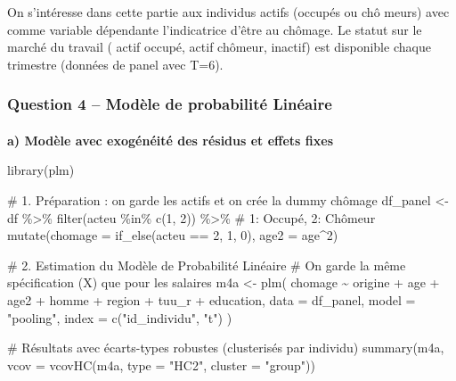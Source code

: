 \documentclass[
  letterpaper,
  DIV=11,
  numbers=noendperiod]{scrartcl}
\makeatletter
\let\oldparagraph\paragraph
\renewcommand{\paragraph}{
    \@ifstar
      \xxxParagraphStar
      \xxxParagraphNoStar
  }
\newcommand{\xxxParagraphStar}[1]{\oldparagraph*{#1}\mbox{}}
\newcommand{\xxxParagraphNoStar}[1]{\oldparagraph{#1}\mbox{}}
\newenvironment{Shaded}{\begin{snugshade}}{\end{snugshade}}
\newcommand{\AttributeTok}[1]{\textcolor[rgb]{0.40,0.45,0.13}{#1}}
\newcommand{\CommentTok}[1]{\textcolor[rgb]{0.37,0.37,0.37}{#1}}
\newcommand{\DecValTok}[1]{\textcolor[rgb]{0.68,0.00,0.00}{#1}}
\newcommand{\FunctionTok}[1]{\textcolor[rgb]{0.28,0.35,0.67}{#1}}
\newcommand{\NormalTok}[1]{\textcolor[rgb]{0.00,0.23,0.31}{#1}}
\newcommand{\OtherTok}[1]{\textcolor[rgb]{0.00,0.23,0.31}{#1}}
\newcommand{\SpecialCharTok}[1]{\textcolor[rgb]{0.37,0.37,0.37}{#1}}
\newcommand{\StringTok}[1]{\textcolor[rgb]{0.13,0.47,0.30}{#1}}
\makeatother
\begin{document}
On s'intéresse dans cette partie aux individus actifs (occupés ou chô
meurs) avec comme variable dépendante l'indicatrice d'être au chômage.
Le statut sur le marché du travail ( actif occupé, actif chômeur,
inactif) est disponible chaque trimestre (données de panel avec T=6).

\subsubsection{Question 4 -- Modèle de probabilité
Linéaire}\label{question-4-moduxe8le-de-probabilituxe9-linuxe9aire}

\paragraph{\texorpdfstring{\textbf{a) Modèle avec exogénéité des résidus
et effets
fixes}}{a) Modèle avec exogénéité des résidus et effets fixes}}\label{a-moduxe8le-avec-exoguxe9nuxe9ituxe9-des-ruxe9sidus-et-effets-fixes}

\begin{Shaded}
\begin{Highlighting}[]
\FunctionTok{library}\NormalTok{(plm)}

\CommentTok{\# 1. Préparation : on garde les actifs et on crée la dummy chômage}
\NormalTok{df\_panel }\OtherTok{\textless{}{-}}\NormalTok{ df }\SpecialCharTok{\%\textgreater{}\%}
  \FunctionTok{filter}\NormalTok{(acteu }\SpecialCharTok{\%in\%} \FunctionTok{c}\NormalTok{(}\DecValTok{1}\NormalTok{, }\DecValTok{2}\NormalTok{)) }\SpecialCharTok{\%\textgreater{}\%} \CommentTok{\# 1: Occupé, 2: Chômeur }
  \FunctionTok{mutate}\NormalTok{(}\AttributeTok{chomage =} \FunctionTok{if\_else}\NormalTok{(acteu }\SpecialCharTok{==} \DecValTok{2}\NormalTok{, }\DecValTok{1}\NormalTok{, }\DecValTok{0}\NormalTok{),}
         \AttributeTok{age2 =}\NormalTok{ age}\SpecialCharTok{\^{}}\DecValTok{2}\NormalTok{)}

\CommentTok{\# 2. Estimation du Modèle de Probabilité Linéaire}
\CommentTok{\# On garde la même spécification (X) que pour les salaires}
\NormalTok{m4a }\OtherTok{\textless{}{-}} \FunctionTok{plm}\NormalTok{(}
\NormalTok{  chomage }\SpecialCharTok{\textasciitilde{}}\NormalTok{ origine }\SpecialCharTok{+}\NormalTok{ age }\SpecialCharTok{+}\NormalTok{ age2 }\SpecialCharTok{+}\NormalTok{ homme }\SpecialCharTok{+}\NormalTok{ region }\SpecialCharTok{+}\NormalTok{ tuu\_r }\SpecialCharTok{+}\NormalTok{ education,}
  \AttributeTok{data =}\NormalTok{ df\_panel,}
  \AttributeTok{model =} \StringTok{"pooling"}\NormalTok{,}
  \AttributeTok{index =} \FunctionTok{c}\NormalTok{(}\StringTok{"id\_individu"}\NormalTok{, }\StringTok{"t"}\NormalTok{)}
\NormalTok{)}

\CommentTok{\# Résultats avec écarts{-}types robustes (clusterisés par individu)}
\FunctionTok{summary}\NormalTok{(m4a, }\AttributeTok{vcov =} \FunctionTok{vcovHC}\NormalTok{(m4a, }\AttributeTok{type =} \StringTok{"HC2"}\NormalTok{, }\AttributeTok{cluster =} \StringTok{"group"}\NormalTok{))}
\end{Highlighting}
\end{Shaded}
\end{document}

